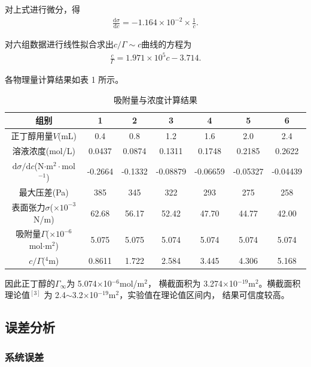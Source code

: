 \documentclass[12pt]{ctexart}
\numberwithin{equation}{section}
\begin{document}
对上式进行微分，得
\begin{align}
    \frac{\mathrm{d}\sigma}{\mathrm{d}c}
    = -1.164\times 10^{-2}\times \frac{1}{c}.
\end{align}

对六组数据进行线性拟合求出$c/\Gamma\sim c$曲线的方程为
\begin{align}
    \frac{c}{\Gamma} = 1.971 \times 10^5 c - 3.714.
\end{align}

各物理量计算结果如表 1 所示。

\begin{longtable}{c|cccccc}
    \caption{吸附量与浓度计算结果} \\
    \hline
    组别 & 1 & 2 & 3 & 4 & 5 & 6 \\
    \hline
    正丁醇用量$V$(mL) & 0.4 & 0.8 & 1.2 & 1.6 & 2.0 & 2.4 \\
    \hline
    溶液浓度(mol/L) & 0.0437 & 0.0874 & 0.1311 & 0.1748 & 0.2185 & 0.2622 \\
    \hline
    $\mathrm{d}\sigma/\mathrm{d}c$(N$\cdot$m$^2\cdot$mol$^{-1}$) &
    -0.2664 & -0.1332 & -0.08879 & -0.06659 & -0.05327 & -0.04439  \\
    \hline
    最大压差(Pa) & 385 & 345 & 322 & 293 & 275 & 258  \\
    \hline
    表面张力$\sigma$($\times 10^{-3}$N/m) &
    62.68 & 56.17 & 52.42 & 47.70 & 44.77 & 42.00  \\
    \hline
    吸附量$\Gamma$($\times10^{-6}$mol$\cdot$m$^2$) &
    5.075 & 5.075 & 5.074 & 5.074 & 5.074 & 5.074  \\
    \hline
    $c/\Gamma$(\times 10$^4$m) &
    0.8611 & 1.722 & 2.584 & 3.445 & 4.306 & 5.168  \\
    \hline
\end{longtable}

因此正丁醇的$\Gamma_\infty$为 5.074$\times$10$^{-6}$mol/m$^2$，
横截面积为 3.274$\times$10$^{-19}$m$^2$。横截面积理论值$^{[3]}$
为 2.4$\sim$3.2$\times$10$^{-19}$m$^2$，实验值在理论值区间内，
结果可信度较高。

\pagebreak

\subsection{误差分析}
\subsubsection{系统误差}
\end{document}
